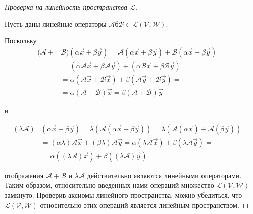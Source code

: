 \begin{proof}[Проверка на линейность пространства $\mathcal{L}$]~

    Пусть даны линейные операторы $\mathscr{A}б \mathscr{B} \in \mathcal{L}(\mathcal{V}, \mathcal{W})$. 

    Поскольку
    \begin{align*}
        (\mathscr{A} + &\mathscr{B})(\alpha\vec{x} + \beta \vec{y}) = \mathscr{A}(\alpha\vec{x} + \beta \vec{y}) + \mathscr{B}(\alpha\vec{x} + \beta \vec{y}) = \\
        &= (\alpha\mathscr{A}\vec{x} + \beta\mathscr{A}\vec{y}) + (\alpha\mathscr{B}\vec{x} + \beta\mathscr{B}\vec{y}) = \\
        &= \alpha(\mathscr{A}\vec{x} + \mathscr{B}\vec{x}) + \beta(\mathscr{A}\vec{y} + \mathscr{B}\vec{y}) = \\
        &= \alpha(\mathscr{A} + \mathscr{B})\vec{x} = \beta(\mathscr{A} + \mathscr{B})\vec{y}
    \end{align*}

    и

    \begin{align*}
        (\lambda\mathscr{A})&(\alpha\vec{x} + \beta \vec{y}) = \lambda(\mathscr{A}(\alpha\vec{x} + \beta\vec{y})) = \lambda (\mathscr{A}(\alpha\vec{x}) + \mathscr{A}(\beta\vec{y})) = \\ 
        &= (\alpha \lambda)\mathscr{A}\vec{x} + (\beta \lambda)\mathscr{A}\vec{y} = \alpha(\lambda \mathscr{A}\vec{x}) + \beta(\lambda \mathscr{A}\vec{y}) = \\
        &= \alpha((\lambda\mathscr{A})\vec{x}) + \beta((\lambda\mathscr{A})\vec{y})
    \end{align*}

    отображения $\mathscr{A} + \mathscr{B}$ и $\lambda \mathscr{A}$ действительно являются линейными операторами. Таким образом, относительно введенных нами операций множество $\mathcal{L}(\mathcal{V}, \mathcal{W})$ замкнуто. Проверив аксиомы линейного пространства, можно убедиться, что $\mathcal{L}(\mathcal{V}, \mathcal{W})$ относительно этих операций является линейным пространством.
\end{proof}